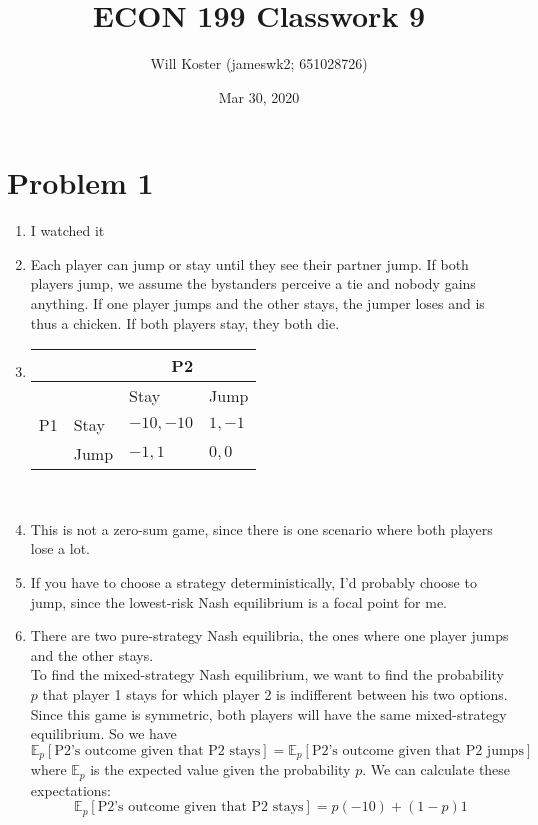 \documentclass[letterpaper]{article}
\begin{document}
\title{ECON 199 Classwork 9}
\author{Will Koster (jameswk2; 651028726)}
\date{Mar 30, 2020}
\maketitle

\section{Problem 1}
\begin{enumerate}
    \item I watched it
    \item Each player can jump or stay until they see their partner jump. If both players jump, we assume the bystanders perceive a tie and nobody gains anything. If one player jumps and the other stays, the jumper loses and is thus a chicken. If both players stay, they both die. 
    \item \begin{tabular}{|l|l|l|l|}
            \multicolumn{3}{r}{P2}                      \\ \hline
            \multirow{3}{*}{P1} &   & Stay        & Jump        \\ \hline
            & Stay & $-10,-10$ & $1, -1$ \\ \hline
            & Jump & $-1, 1$ & $0,0$ \\ \hline
        \end{tabular} \\
    \item This is not a zero-sum game, since there is one scenario where both players lose a lot.
    \item If you have to choose a strategy deterministically, I'd probably choose to jump, since the lowest-risk Nash equilibrium is a focal point for me. 
    \item There are two pure-strategy Nash equilibria, the ones where one player jumps and the other stays. \\
        To find the mixed-strategy Nash equilibrium, we want to find the probability $p$ that player 1 stays for which player 2 is indifferent between his two options. Since this game is symmetric, both players will have the same mixed-strategy equilibrium. So we have 
        \[
            \mathbb{E}_p[\text{P2's outcome given that P2 stays}] = \mathbb{E}_p[\text{P2's outcome given that P2 jumps}]
        \]
        where $\mathbb{E}_p$ is the expected value given the probability $p$. We can calculate these expectations: 
        \[
            \mathbb{E}_p[\text{P2's outcome given that P2 stays}] = p(-10) + (1 - p)1
        \]


\end{enumerate}
\end{document}
